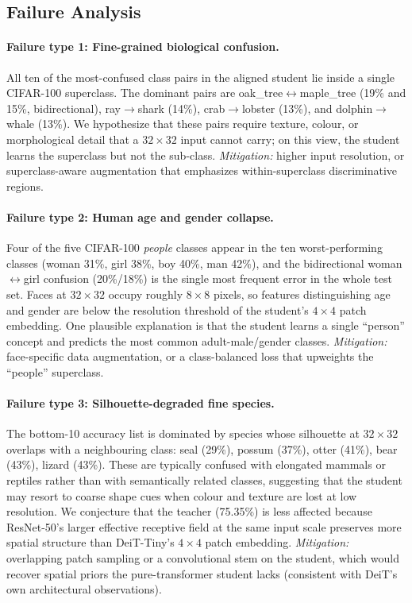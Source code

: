 \documentclass[11pt, letterpaper]{article}
\begin{document}
\subsection{Failure Analysis}

\label{sec:failure}

\paragraph{Failure type 1: Fine-grained biological confusion.}
All ten of the most-confused class pairs in the aligned student lie inside
a single CIFAR-100 superclass. The dominant pairs are
oak\_tree$\leftrightarrow$maple\_tree (19\% and 15\%, bidirectional),
ray$\to$shark (14\%), crab$\to$lobster (13\%), and
dolphin$\to$whale (13\%). We hypothesize that these pairs require texture, colour, or morphological
detail that a $32\times32$ input cannot carry; on this view, the student
learns the superclass but not the sub-class.
\emph{Mitigation:} higher input resolution, or superclass-aware
augmentation that emphasizes within-superclass discriminative regions.

\paragraph{Failure type 2: Human age and gender collapse.}
Four of the five CIFAR-100 \emph{people} classes appear in the ten
worst-performing classes (woman 31\%, girl 38\%, boy 40\%, man 42\%), and
the bidirectional woman$\leftrightarrow$girl confusion (20\%/18\%) is the
single most frequent error in the whole test set. Faces at $32\times32$
occupy roughly $8\times8$ pixels, so features distinguishing age and gender
are below the resolution threshold of the student's $4\times4$ patch
embedding. One plausible explanation is that the student learns a single ``person''
concept and predicts the most common adult-male/gender classes.
\emph{Mitigation:} face-specific data augmentation, or a class-balanced
loss that upweights the ``people'' superclass.

\paragraph{Failure type 3: Silhouette-degraded fine species.}
The bottom-10 accuracy list is dominated by species whose silhouette at
$32\times32$ overlaps with a neighbouring class: seal (29\%), possum (37\%),
otter (41\%), bear (43\%), lizard (43\%). These are typically confused with
elongated mammals or reptiles rather than with semantically related
classes, suggesting that the student may resort to coarse shape cues when colour
and texture are lost at low resolution. We conjecture that the teacher (75.35\%) is less affected because
ResNet-50's larger effective receptive field at the same input scale
preserves more spatial structure than DeiT-Tiny's $4\times4$ patch
embedding.
\emph{Mitigation:} overlapping patch sampling or a convolutional stem on
the student, which would recover spatial priors the pure-transformer
student lacks (consistent with DeiT's own architectural observations).
\end{document}
